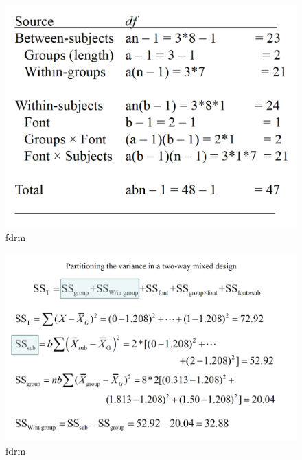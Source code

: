 \documentclass[]{book}
\theoremstyle{definition}
\theoremstyle{definition}
\theoremstyle{definition}
\theoremstyle{remark}
\begin{document}
\begin{figure}
\centering
\includegraphics{img/hicksfdrm7.png}
\caption{fdrm}
\end{figure}

\begin{figure}
\centering
\includegraphics{img/hicksfdrm8.png}
\caption{fdrm}
\end{figure}
\end{document}

